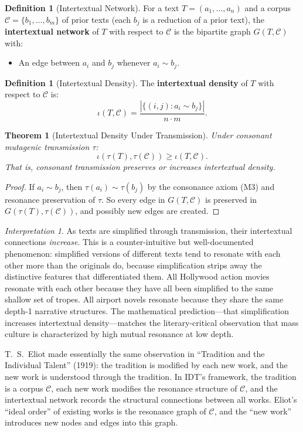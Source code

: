 \documentclass[11pt,openany]{book}
\theoremstyle{definition}
\newtheorem{definition}[axiom]{Definition}
\theoremstyle{plain}
\newtheorem{theorem}[axiom]{Theorem}
\theoremstyle{remark}
\newtheorem{interpretation}[axiom]{Interpretation}
\newcommand{\res}{\sim}                      %
\newcommand{\transmit}{\tau}                 %
\begin{document}
\begin{definition}[Intertextual Network]
For a text $T = (a_1, \ldots, a_n)$ and a corpus $\mathcal{C} = \{b_1, \ldots, b_m\}$ of prior texts (each $b_j$ is a reduction of a prior text), the \textbf{intertextual network} of $T$ with respect to $\mathcal{C}$ is the bipartite graph $G(T, \mathcal{C})$ with:
\begin{itemize}
\item An edge between $a_i$ and $b_j$ whenever $a_i \res b_j$.
\end{itemize}
\end{definition}

\begin{definition}[Intertextual Density]
The \textbf{intertextual density} of $T$ with respect to $\mathcal{C}$ is:
\[
\iota(T, \mathcal{C}) = \frac{|\{(i,j) : a_i \res b_j\}|}{n \cdot m}.
\]
\end{definition}

\begin{theorem}[Intertextual Density Under Transmission]
Under consonant mutagenic transmission $\transmit$:
\[
\iota(\transmit(T), \transmit(\mathcal{C})) \geq \iota(T, \mathcal{C}).
\]
That is, consonant transmission preserves or increases intertextual density.
\end{theorem}

\begin{proof}
If $a_i \res b_j$, then $\transmit(a_i) \res \transmit(b_j)$ by the consonance axiom (M3) and resonance preservation of $\transmit$. So every edge in $G(T, \mathcal{C})$ is preserved in $G(\transmit(T), \transmit(\mathcal{C}))$, and possibly new edges are created.
\end{proof}

\begin{interpretation}
As texts are simplified through transmission, their intertextual connections \emph{increase}. This is a counter-intuitive but well-documented phenomenon: simplified versions of different texts tend to resonate with each other more than the originals do, because simplification strips away the distinctive features that differentiated them. All Hollywood action movies resonate with each other because they have all been simplified to the same shallow set of tropes. All airport novels resonate because they share the same depth-1 narrative structures. The mathematical prediction---that simplification increases intertextual density---matches the literary-critical observation that mass culture is characterized by high mutual resonance at low depth.

T.~S.\ Eliot made essentially the same observation in ``Tradition and the Individual Talent'' (1919): the tradition is modified by each new work, and the new work is understood through the tradition. In IDT's framework, the tradition is a corpus $\mathcal{C}$, each new work modifies the resonance structure of $\mathcal{C}$, and the intertextual network records the structural connections between all works. Eliot's ``ideal order'' of existing works is the resonance graph of $\mathcal{C}$, and the ``new work'' introduces new nodes and edges into this graph.
\end{interpretation}
\end{document}
